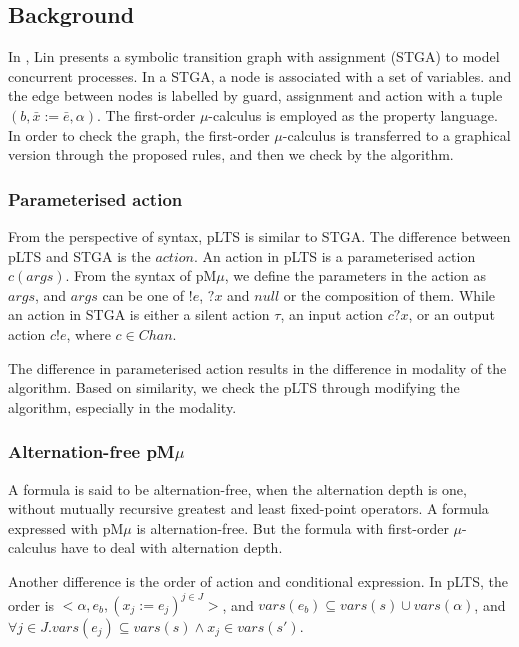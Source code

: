 \documentclass[runningheads,a4paper]{llncs}
\begin{document}
\subsection{Background}

 In \cite{lin1996stga}, Lin presents a symbolic transition graph with assignment (STGA) to model concurrent processes. In a STGA, a node is associated with a set of variables. and the edge between nodes is labelled by guard, assignment and action with a tuple $(b, \bar{x}:=\bar{e}, \alpha)$. The first-order $\mu$-calculus is employed as the property language. In order to check the graph, the first-order $\mu$-calculus is transferred to a graphical version through the proposed rules, and then we check {\color{red}{STGA and the modal graph}} by the algorithm.
 

 
 \subsubsection{Parameterised action}
From the perspective of syntax, pLTS is similar to STGA. The difference between pLTS and STGA is the $\mathit{action}$. An action in pLTS is a parameterised action $c(args)$. From the syntax of pM$\mu$, we define the parameters in the action as $args$, and $args$ can be one of $!e$, $?x$ and $null$ or the composition of them. While an action in STGA is either a silent action $\tau$, an input action $c?x$, or an output action $c!e$, where $c\in Chan$. 

The difference in parameterised action results in the difference in modality of the algorithm. Based on similarity, we check the pLTS through modifying the algorithm, especially in the modality.  

\subsubsection{Alternation-free pM$\mu$}

A formula is said to be alternation-free, when the alternation depth is one, without mutually recursive greatest and least fixed-point operators. A formula expressed with pM$\mu$ is alternation-free. But the formula with first-order $\mu$-calculus have to deal with alternation depth.{\color{red}{[To do Tengfei: definition of alternation depth]}}


 {\color{red}{The order of action and conditional expression???}}
Another difference is the order of action and conditional expression. In pLTS, the order is $<\alpha, e_{b}, (x_{j}:=e_{j})^{j\in J}>$,  and $vars(e_{b})\subseteq vars(s)\cup vars(\alpha)$, and $\forall j\in J. vars(e_{j})\subseteq vars(s)\wedge x_{j}\in vars(s')$. 
\end{document}
